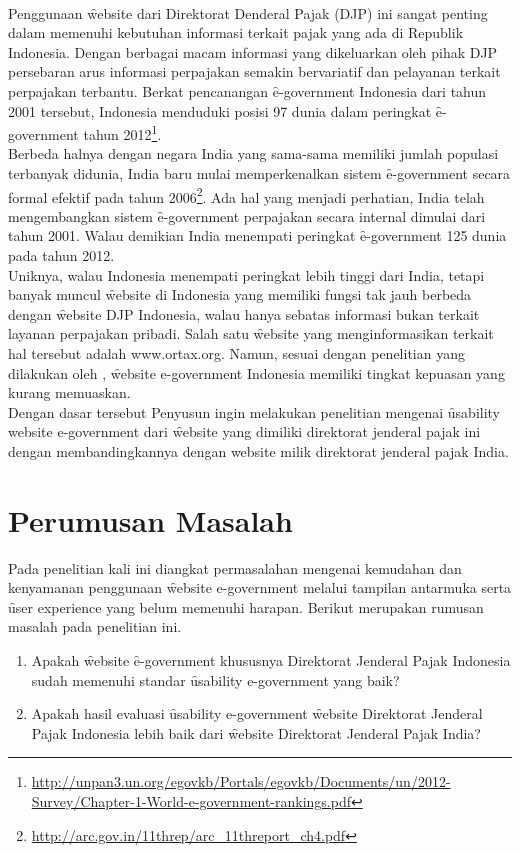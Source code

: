 \newline\\
Penggunaan \f{website} dari Direktorat Denderal Pajak (DJP) ini sangat penting dalam memenuhi kebutuhan informasi terkait pajak yang ada di Republik Indonesia. Dengan berbagai macam informasi yang dikeluarkan oleh pihak DJP persebaran arus informasi perpajakan semakin bervariatif dan pelayanan terkait perpajakan terbantu. Berkat pencanangan \f{e-government} Indonesia dari tahun 2001 tersebut, Indonesia menduduki posisi 97 dunia dalam peringkat \f{e-government} tahun 2012\footnote{\url{http://unpan3.un.org/egovkb/Portals/egovkb/Documents/un/2012-Survey/Chapter-1-World-e-government-rankings.pdf}}. 
\newline\\
Berbeda halnya dengan negara India yang sama-sama memiliki jumlah populasi terbanyak didunia, India baru mulai memperkenalkan sistem \f{e-government} secara formal efektif pada tahun 2006\footnote{\url{http://arc.gov.in/11threp/arc_11threport_ch4.pdf}}. Ada hal yang menjadi perhatian, India telah mengembangkan sistem \f{e-government} perpajakan secara internal dimulai dari tahun 2001. Walau demikian India menempati peringkat \f{e-government} 125 dunia pada tahun 2012.
\newline\\
Uniknya, walau Indonesia menempati peringkat lebih tinggi dari India, tetapi banyak muncul \f{website} di Indonesia yang memiliki fungsi tak jauh berbeda dengan \f{website} DJP Indonesia, walau hanya sebatas informasi bukan terkait layanan perpajakan pribadi. Salah satu \f{website} yang menginformasikan terkait hal tersebut adalah www.ortax.org. Namun, sesuai dengan penelitian yang dilakukan oleh \citet{paper.dahlan}, \f{website e-government} Indonesia memiliki tingkat kepuasan yang kurang memuaskan.
\newline\\ 
Dengan dasar tersebut Penyusun ingin melakukan penelitian mengenai \f{usability website e-government} dari \f{website} yang dimiliki direktorat jenderal pajak ini dengan membandingkannya dengan {website} milik direktorat jenderal pajak India.
\section{Perumusan Masalah}
Pada penelitian kali ini diangkat permasalahan mengenai kemudahan dan kenyamanan penggunaan \f{website e-government} melalui tampilan antarmuka serta \f{user experience} yang belum memenuhi harapan. Berikut merupakan rumusan masalah pada penelitian ini.
\begin{enumerate}
	\item Apakah \f{website} \f{e-government} khususnya Direktorat Jenderal Pajak Indonesia sudah memenuhi standar \f{usability e-government} yang baik?
	\item Apakah hasil evaluasi \f{usability e-government} \f{website} Direktorat Jenderal Pajak Indonesia lebih baik dari \f{website} Direktorat Jenderal Pajak India?
\end{enumerate}

